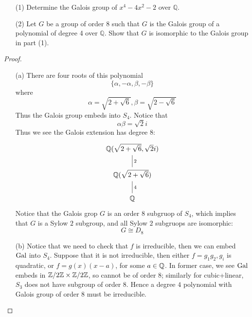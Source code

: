 \begin{prob}[F2016-Q4]
    \phantom{text}
    \begin{itemize}
        \item[(1)] Determine the Galois group of \(x^{4}-4x^{2}-2\) over \(\mathbb{Q}\).
        \item[(2)] Let \(G\) be a group of order 8 such that \(G\) is the Galois group of a polynomial of degree 4 over \(\mathbb{Q}\). Show that \(G\) is isomorphic to the Galois group in part (1).
    \end{itemize}
\end{prob}
\begin{proof}
    \begin{itemize}
        \item[(a)] There are four roots of this polynomial 
        \begin{equation*}
            \{\alpha, -\alpha, \beta, -\beta\}
        \end{equation*}
        where 
        \begin{equation*}
            \alpha=\sqrt{2+\sqrt{6}}, \beta=\sqrt{2-\sqrt{6}}
        \end{equation*}
        Thus the Galois group embeds into $S_4$. Notice that 
        \begin{equation*}
            \alpha\beta=\sqrt{2}i
        \end{equation*}
        Thus we see the Galois extension has degree $8$:
        \[\begin{tikzcd}
            {\mathbb{Q}(\sqrt{2+\sqrt{6}},\sqrt{2}i)} \\
            {\mathbb{Q}(\sqrt{2+\sqrt{6}})} \\
            {\mathbb{Q}}
            \arrow["2", no head, from=1-1, to=2-1]
            \arrow["4", no head, from=2-1, to=3-1]
        \end{tikzcd}\]
        Notice that the Galois grop $G$ is an order $8$ subgruop of $S_4$, which implies that $G$ is a Sylow $2$ subgroup, and all Sylow $2$ subgruops are isomorphic: 
        \begin{equation*}
            G\cong D_8
        \end{equation*}

        \item[(b)] Notice that we need to check that $f$ is irreducible, then we can embed $\text{Gal}$ into $S_4$. Suppose that it is not irreducible, then either $f=g_1g_2,g_i$ is quadratic, or $f=g(x)(x-a)$, for some $a\in\mathbb{Q}$. In former case, we see $\text{Gal}$ embeds in $\mathbb{Z}/2\mathbb{Z}\times\mathbb{Z}/2\mathbb{Z}$, so cannot be of order $8$; similarly for cubic+linear, $S_3$ does not have subgroup of order $8$. Hence a degree $4$ polynomial with Galois group of order $8$ must be irreducible.
    \end{itemize}
\end{proof}


